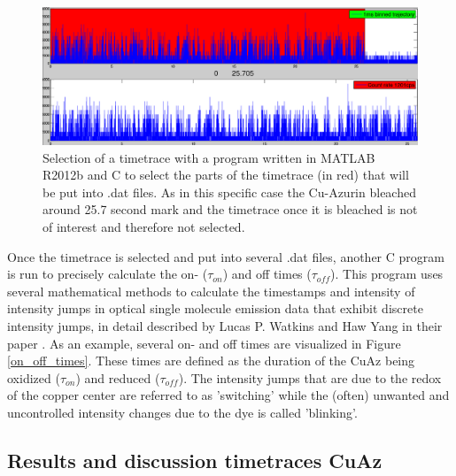 \documentclass[twoside,single]{lion-msc}
\begin{document}
\begin{figure}[ht!]
\centering
\includegraphics[width=\textwidth]{timetrace_selection}
\caption{Selection of a timetrace with a program written in MATLAB R2012b and C to select the parts of the timetrace (in red) that will be put into .dat files. As in this specific case the Cu-Azurin bleached around 25.7 second mark and the timetrace once it is bleached is not of interest and therefore not selected.}
\label{timetrace_selection}
\end{figure}

Once the timetrace is selected and put into several .dat files, another C program is run to precisely calculate the  on- ($\tau_{on}$) and off times ($\tau_{off}$). This program uses several mathematical methods to calculate the timestamps and intensity of intensity jumps in optical single molecule emission data that exhibit discrete intensity jumps, in detail described by Lucas P. Watkins and Haw Yang in their paper \cite{And2004}. As an example, several on- and off times are visualized in Figure \ref{on_off_times}. These times are defined as the duration of the CuAz being oxidized ($\tau_{on}$) and reduced ($\tau_{off}$). The intensity jumps that are due to the redox of the copper center are referred to as 'switching' while the (often) unwanted and uncontrolled intensity changes due to the dye is called 'blinking'. 

\subsection*{Results and discussion timetraces CuAz}
\end{document}
